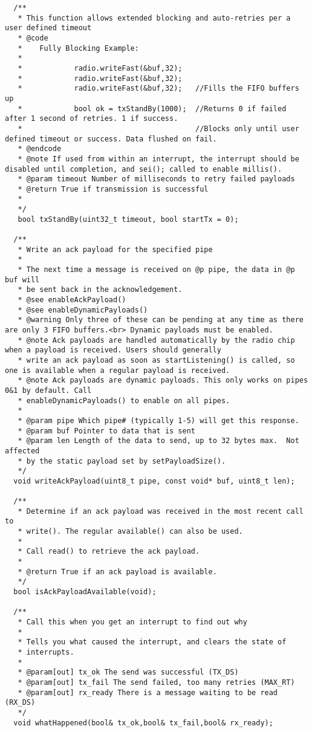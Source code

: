 \documentclass{article}
\begin{document}
\begin{itemize}
\begin{enumerate}
\begin{enumerate}
\begin{lstlisting}
  /**
   * This function allows extended blocking and auto-retries per a user defined timeout
   * @code
   *	Fully Blocking Example:
   *
   *			radio.writeFast(&buf,32);
   *			radio.writeFast(&buf,32);
   *			radio.writeFast(&buf,32);   //Fills the FIFO buffers up
   *			bool ok = txStandBy(1000);  //Returns 0 if failed after 1 second of retries. 1 if success.
   *					  				    //Blocks only until user defined timeout or success. Data flushed on fail.
   * @endcode
   * @note If used from within an interrupt, the interrupt should be disabled until completion, and sei(); called to enable millis().
   * @param timeout Number of milliseconds to retry failed payloads
   * @return True if transmission is successful
   *
   */
   bool txStandBy(uint32_t timeout, bool startTx = 0);

  /**
   * Write an ack payload for the specified pipe
   *
   * The next time a message is received on @p pipe, the data in @p buf will
   * be sent back in the acknowledgement.
   * @see enableAckPayload()
   * @see enableDynamicPayloads()
   * @warning Only three of these can be pending at any time as there are only 3 FIFO buffers.<br> Dynamic payloads must be enabled.
   * @note Ack payloads are handled automatically by the radio chip when a payload is received. Users should generally
   * write an ack payload as soon as startListening() is called, so one is available when a regular payload is received.
   * @note Ack payloads are dynamic payloads. This only works on pipes 0&1 by default. Call 
   * enableDynamicPayloads() to enable on all pipes.
   *
   * @param pipe Which pipe# (typically 1-5) will get this response.
   * @param buf Pointer to data that is sent
   * @param len Length of the data to send, up to 32 bytes max.  Not affected
   * by the static payload set by setPayloadSize().
   */
  void writeAckPayload(uint8_t pipe, const void* buf, uint8_t len);

  /**
   * Determine if an ack payload was received in the most recent call to
   * write(). The regular available() can also be used.
   *
   * Call read() to retrieve the ack payload.
   *
   * @return True if an ack payload is available.
   */
  bool isAckPayloadAvailable(void);

  /**
   * Call this when you get an interrupt to find out why
   *
   * Tells you what caused the interrupt, and clears the state of
   * interrupts.
   *
   * @param[out] tx_ok The send was successful (TX_DS)
   * @param[out] tx_fail The send failed, too many retries (MAX_RT)
   * @param[out] rx_ready There is a message waiting to be read (RX_DS)
   */
  void whatHappened(bool& tx_ok,bool& tx_fail,bool& rx_ready);


\end{lstlisting}
\end{enumerate}
\end{enumerate}
\end{itemize}
\end{document}
